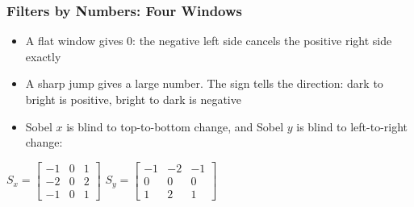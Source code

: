 \begin{frame}[fragile] \frametitle{Filters by Numbers: Four Windows}
\begin{center}
\small
{}
\end{center}
\begin{itemize}
\item A flat window gives 0: the negative left side cancels the positive right side exactly
\item A sharp jump gives a large number. The sign tells the direction: dark to bright is positive, bright to dark is negative
\item Sobel $x$ is blind to top-to-bottom change, and Sobel $y$ is blind to left-to-right change:
\end{itemize}
\begin{center}
$S_x = \begin{bmatrix}-1&0&1\\-2&0&2\\-1&0&1\end{bmatrix}$
\qquad
$S_y = \begin{bmatrix}-1&-2&-1\\0&0&0\\1&2&1\end{bmatrix}$
\end{center}
\end{frame}

